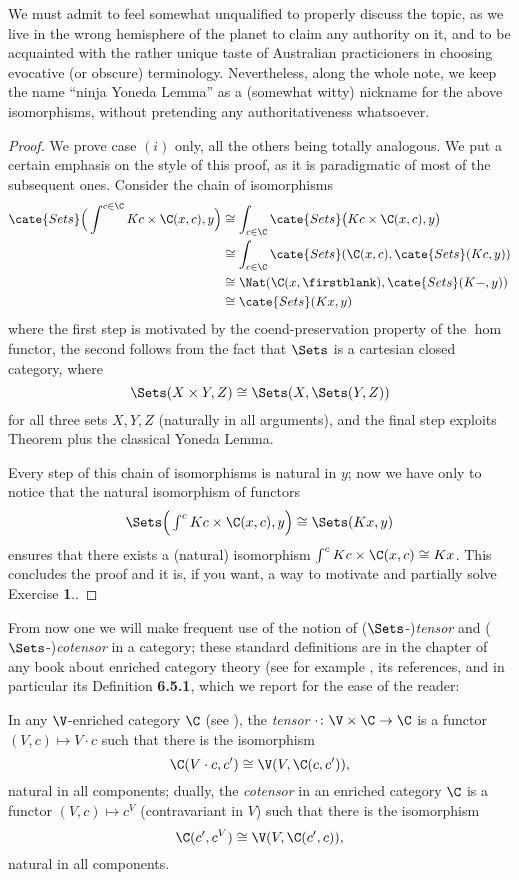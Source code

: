 We must admit to feel somewhat unqualified to properly discuss the topic, as we live in the wrong hemisphere of the planet to claim any authority on it, and to be acquainted with the rather unique taste of Australian practicioners in choosing evocative (or obscure) terminology. Nevertheless, along the whole note, we keep the name ``ninja Yoneda Lemma'' as a (somewhat witty) nickname for the above isomorphisms, without pretending any authoritativeness whatsoever.
\begin{proof}
We prove case $(i)$ only, all the others being totally analogous. We put a certain emphasis on the style of this proof, as it is paradigmatic of most of the subsequent ones. Consider the chain of isomorphisms
\begin{align*}
\cate{Sets}\Big(\displaystyle \int^{c\in\C} Kc\times \C(x,c),y\Big)&\cong \int_{c\in\C} \cate{Sets}\big( Kc\times \C(x,c),y \big)\\
&\cong \int_{c\in\C}\cate{Sets}(\C(x,c),\cate{Sets}(Kc,y))\\
&\cong \Nat(\C(x,\firstblank),\cate{Sets}(K-,y))\\
&\cong\cate{Sets}(Kx,y)
\end{align*}
where the first step is motivated by the coend-preservation property of the $\hom$ functor, the second follows from the fact that $\Sets$ is a cartesian closed category, where 
\[
\Sets(X\times Y, Z)\cong \Sets(X, \Sets(Y,Z))
\]
for all three sets $X,Y,Z$ (naturally in all arguments), and the final step exploits Theorem  plus the classical Yoneda Lemma.

Every step of this chain of isomorphisms is natural in $y$; now we have only to notice that the natural isomorphism of functors
\[
\Sets\Big(\textstyle \int^c Kc\times \C(x,c),y\Big)\cong \Sets(Kx,y)
\]
ensures that there exists a (natural) isomorphism $\int^c Kc\times \C(x,c)\cong Kx$. This concludes the proof and it is, if you want, a way to motivate and partially solve Exercise \textbf{1}..
\end{proof}
From now one we will make frequent use of the notion of ($\Sets$-)\emph{tensor} and ($\Sets$-)\emph{cotensor} in a category; these standard definitions are in the chapter of any book about enriched category theory (see for example \cite[Ch. \textbf{6}]{Bor2}, its references, and in particular its Definition \textbf{6.5.1}, which we report for the ease of the reader:
\begin{definition}\label{tenscotens}
In any $\V$-enriched category $\C$ (see \cite[Def\@. \textbf{6.2.1}]{Bor2}), the \emph{tensor} $\cdot\colon \V\times \C\to \C$ is a functor $(V, c)\mapsto V\cdot c$ such that there is the isomorphism \[ \label{ten} \C(V\cdot c, c')\cong \V(V, \C(c,c')),\] natural in all components; dually, the \emph{cotensor} in an enriched category $\C$ is a functor $(V, c)\mapsto c^V$ (contravariant in $V$) such that there is the isomorphism \[ \label{coten} \C(c', c^V)\cong \V(V, \C(c',c)),\] natural in all components. 
\end{definition}
